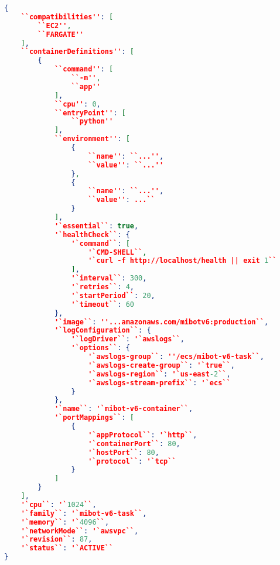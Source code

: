 \begin{lstlisting}[language=json, caption={ECS Task Definition}, label={lst:json}]
{
    ``compatibilities'': [
        ``EC2'',
        ``FARGATE''
    ],
    ``containerDefinitions'': [
        {
            ``command'': [
                ``-m'',
                ``app''
            ],
            ``cpu'': 0,
            ``entryPoint'': [
                ``python''
            ],
            ``environment'': [
                {
                    ``name'': ``...'',
                    ``value'': ``...''
                },
                {
                    ``name'': ``...'',
                    ``value'': ...``
                }
            ],
            '`essential``: true,
            '`healthCheck``: {
                '`command``: [
                    '`CMD-SHELL``,
                    '`curl -f http://localhost/health || exit 1``
                ],
                '`interval``: 300,
                '`retries``: 4,
                '`startPeriod``: 20,
                '`timeout``: 60
            },
            '`image``: ''...amazonaws.com/mibotv6:production``,
            '`logConfiguration``: {
                '`logDriver``: '`awslogs``,
                '`options``: {
                    '`awslogs-group``: ''/ecs/mibot-v6-task``,
                    '`awslogs-create-group``: '`true``,
                    '`awslogs-region``: '`us-east-2``,
                    '`awslogs-stream-prefix``: '`ecs``
                }
            },
            '`name``: '`mibot-v6-container``,
            '`portMappings``: [
                {
                    '`appProtocol``: '`http``,
                    '`containerPort``: 80,
                    '`hostPort``: 80,
                    '`protocol``: '`tcp``
                }
            ]
        }
    ],
    '`cpu``: '`1024``,
    '`family``: '`mibot-v6-task``,
    '`memory``: '`4096``,
    '`networkMode``: '`awsvpc``,
    '`revision``: 87,
    '`status``: '`ACTIVE``
}
\end{lstlisting}



